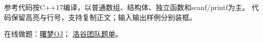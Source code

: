 \noindent 参考代码按C++17编译，以普通数组、结构体、独立函数和scanf/printf为主。
代码保留高亮与行号，支持复制正文；输入输出样例分别装框。

\noindent 在线做题：\href{https://oj.shumeng.tech/p}{曙梦OJ}；
\href{https://www.luogu.com.cn/team/113242/training}{洛谷团队题单}。
\tableofcontents
\newpage
